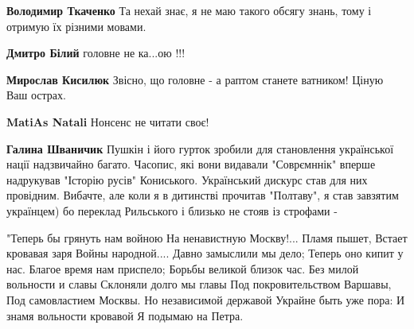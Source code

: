 \begin{itemize}
\begin{itemize}
\textbf{Володимир Ткаченко} Та нехай знає, я не маю такого обсягу знань, тому і отримую їх різними мовами.

 
\textbf{Дмитро Білий} головне не ка...ою !!!

 
\textbf{Мирослав Кисилюк} Звісно, що головне - а раптом станете ватником! Ціную Ваш острах.
\end{itemize}

 
\textbf{MatiAs Natali} Нонсенс не читати своє!

\begin{itemize}
 
\textbf{Галина Шваничик} Пушкін і його гурток зробили для становлення української нації надзвичайно багато. Часопис, які вони видавали "Соврємннік" вперше надрукував "Історію русів" Кониського. Український дискурс став для них провідним. Вибачте, але коли я в дитинстві прочитав "Полтаву", я став завзятим українцем) бо переклад Рильського і близько не стояв із строфами - 

\obeycr
"Теперь бы грянуть нам войною
На ненавистную Москву!... Пламя пышет,
Встает кровавая заря
Войны народной.... Давно замыслили мы дело;
Теперь оно кипит у нас.
Благое время нам приспело;
Борьбы великой близок час.
Без милой вольности и славы
Склоняли долго мы главы
Под покровительством Варшавы,
Под самовластием Москвы.
Но независимой державой
Украйне быть уже пора:
И знамя вольности кровавой
Я подымаю на Петра.
\restorecr
\end{itemize}


\end{itemize}
